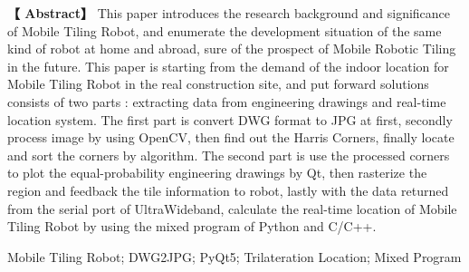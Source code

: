 \newpage

\centerline{\fangsong\bf{}}

\centerline{\fangsong\bf{}}

\centerline{\fangsong\bf{}}




\vskip 20bp

\hspace{4bp} {\textbf{【 Abstract】}} 
This paper introduces the research background and significance of Mobile Tiling Robot, and enumerate the development situation of the same kind of robot at home and abroad, sure of the prospect of Mobile Robotic Tiling in the future. This paper is starting from the demand of the indoor location for Mobile Tiling Robot in the real construction site, and put forward solutions consists of two parts : extracting data from  engineering drawings and real-time location system. The first part is convert DWG format to JPG at first, secondly process image by using OpenCV, then find out the Harris Corners, finally locate and sort the corners by algorithm. The second part is use the processed corners to plot the equal-probability engineering drawings by Qt, then rasterize the region and feedback the tile information to robot, lastly with the data returned from the serial port of UltraWideband, calculate the real-time location of Mobile Tiling Robot by using the mixed program of Python and C/C++.

\vskip 10bp

Mobile Tiling Robot; DWG2JPG; PyQt5; Trilateration Location; Mixed Program